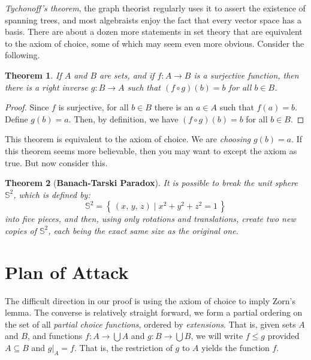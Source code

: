 \documentclass{article}
\newtheorem{theorem}{Theorem}
\begin{document}
        \textit{Tychonoff's theorem}, the graph theorist regularly
        uses it to assert the existence of spanning trees, and most algebraists
        enjoy the fact that every vector space has a basis. There are about
        a dozen more statements in set theory that are equivalent to the
        axiom of choice, some of which may seem even more obvious. Consider
        the following.
        \begin{theorem}
            If $A$ and $B$ are sets, and if $f:A\rightarrow{B}$ is a
            surjective function, then there is a \textit{right inverse}
            $g:B\rightarrow{A}$ such that $(f\circ{g})(b)=b$ for all
            $b\in{B}$.
        \end{theorem}
        \begin{proof}
            Since $f$ is surjective, for all $b\in{B}$ there is an $a\in{A}$
            such that $f(a)=b$. Define $g(b)=a$. Then, by definition, we have
            $(f\circ{g})(b)=b$ for all $b\in{B}$.
        \end{proof}
        This theorem is equivalent to the axiom of choice. We are
        \textit{choosing} $g(b)=a$. If this theorem seems more believable,
        then you may want to except the axiom as true. But now consider this.
        \begin{theorem}[\textbf{Banach-Tarski Paradox}]
            It is possible to break the unit sphere $\mathbb{S}^{2}$, which
            is defined by:
            \begin{equation}
                \mathbb{S}^{2}
                =\left\{\,(x,\,y,\,z)\;\big|\;x^{2}+y^{2}+z^{2}=1\,\right\}
            \end{equation}
            into five pieces, and then, using only rotations and translations,
            create two new copies of $\mathbb{S}^{2}$, each being the exact
            same size as the original one.
        \end{theorem}
    \section{Plan of Attack}
        The difficult direction in our proof is using the axiom of choice to
        imply Zorn's lemma. The converse is relatively straight forward, we
        form a partial ordering on the set of all
        \textit{partial choice functions}, ordered by \textit{extensions}.
        That is, given sets $A$ and $B$, and functions
        $f:A\rightarrow\bigcup{A}$ and $g:B\rightarrow\bigcup{B}$, we will
        write $f\leq{g}$ provided $A\subseteq{B}$ and
        $g|_{A}=f$. That is, the restriction of $g$ to $A$ yields the function
        $f$.
\end{document}
